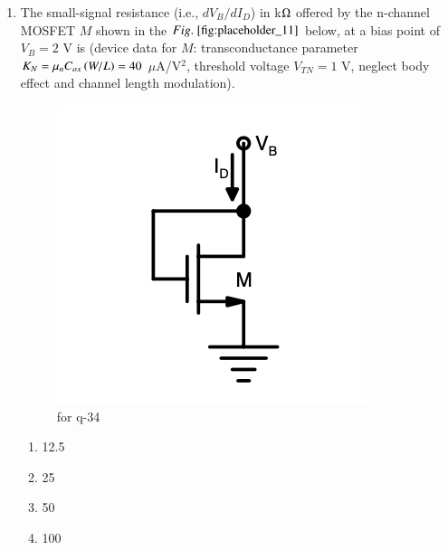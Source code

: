 \documentclass[journal,12pt,onecolumn]{IEEEtran}
\theoremstyle{remark}
\begin{document}
\begin{enumerate}
\item The small-signal resistance (i.e., $dV_B/dI_D$) in k$\ohm$ offered by the n-channel MOSFET $M$ shown in the $\figref{fig:placeholder_11}$ below, at a bias point of $V_B = 2$ V is (device data for $M$: transconductance parameter $K_N = \mu_n C_{ox} \left(W/L\right) = 40$ $\mu$A/V$^2$, threshold voltage $V_{TN} = 1$ V, neglect body effect and channel length modulation).
\begin{figure}[H]
    \centering
    \includegraphics[width=0.5\columnwidth]{figs/fig_11.png}
    \caption{for q-34}
    \label{fig:placeholder_11}
\end{figure}
\begin{multicols}{4}
\begin{enumerate}
\item 12.5
\item 25
\item 50
\item 100
\end{enumerate}
\end{multicols}
\hfill {}


\end{enumerate}
\end{document}
